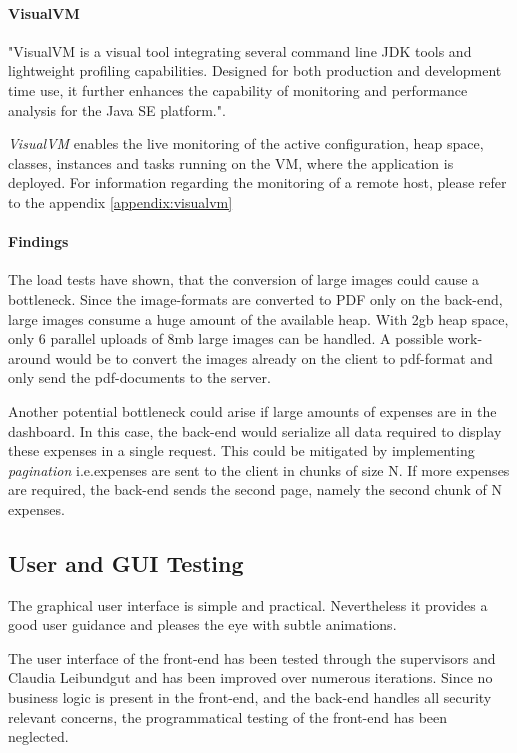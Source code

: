 \paragraph{VisualVM} "VisualVM is a visual tool integrating several command line JDK tools and lightweight profiling capabilities. Designed for both production and development time use, it further enhances the capability of monitoring and performance analysis for the Java SE platform."\cite{visualvm}.\par 
\textit{VisualVM} enables the live monitoring of the active configuration, heap space, classes, instances and tasks running on the VM, where the application is deployed. For information regarding the monitoring of a remote host, please refer to the appendix \ref{appendix:visualvm} \par

\paragraph{Findings}
The load tests have shown, that the conversion of large images could cause a bottleneck. Since the image-formats are converted to PDF only on the back-end, large images consume a huge amount of the available heap. With 2gb heap space, only 6 parallel uploads of 8mb large images can be handled. A possible work-around would be to convert the images already on the client to pdf-format and only send the pdf-documents to the server.\par

Another potential bottleneck could arise if large amounts of expenses are in the dashboard. In this case, the back-end would serialize all data required to display these expenses in a single request. This could be mitigated by implementing \textit{pagination} i.e.expenses are sent to the client in chunks of size N. If more expenses are required, the back-end sends the second page, namely the second chunk of N expenses.

\subsection{User and GUI Testing}
The graphical user interface is simple and practical. Nevertheless it provides a good user guidance and pleases the eye with subtle animations.\par

The user interface of the front-end has been tested through the supervisors and Claudia Leibundgut and has been improved over numerous iterations. Since no business logic is present in the front-end, and the back-end handles all security relevant concerns, the programmatical testing of the front-end has been neglected.
